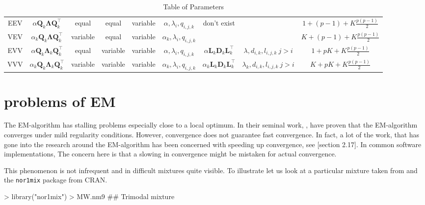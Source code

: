 \begin{table}[!htb]
{\begin{tabular}{| c | c c c c c | c c c |}
        EEV    & $ \alpha \pmb{Q}_k \pmb{\Lambda} \pmb{Q}_k^\top $ &equal & equal & variable & $ \alpha, \lambda_{i}, q_{i,j,k} $ &  don't exist  & & $ 1+(p-1)+K\frac{p(p-1)}{2} $ \\
        VEV    & $ \alpha_k \pmb{Q}_k \pmb{\Lambda} \pmb{Q}_k^\top $ &variable & equal & variable & $ \alpha_k, \lambda_{i}, q_{i,j,k} $ & & & $ K+(p-1)+K\frac{p(p-1)}{2} $ \\
        \hline
        EVV    & $ \alpha \pmb{Q}_k \pmb{\Lambda}_k \pmb{Q}_k^\top $ & equal & variable & variable & $ \alpha, \lambda_{i}, q_{i,j,k} $ & $ \alpha \pmb{L}_k \pmb{D}_k \pmb{L}_k^\top $ & $ \lambda, d_{i,k}, l_{i,j,k}\ j>i $ & $ 1+pK+K\frac{p(p-1)}{2} $  \\
        VVV    & $ \alpha_k \pmb{Q}_k \pmb{\Lambda}_k \pmb{Q}_k^\top $ & variable & variable & variable & $ \alpha_k, \lambda_{i}, q_{i,j,k} $ & $ \alpha_k \pmb{L}_k \pmb{D}_k \pmb{L}_k^\top $ & $ \lambda_k, d_{i,k}, l_{i,j,k}\ j>i $ & $ K+pK+K\frac{p(p-1)}{2} $ \\
        \hline
    \end{tabular}

}

\caption{Table of Parameters}
\label{table:param}
\end{table}

\clearpage


\section{problems of EM}


The EM-algorithm has stalling problems especially close to a local optimum.
In their seminal work, \cite{Dem77}, have proven that the EM-algorithm 
converges under mild regularity conditions. 
However, convergence does not guarantee fast convergence. In fact, a lot of 
the work, that has gone into the research around the EM-algorithm has been 
concerned with speeding up convergence, see \cite{McL00}[section 2.17].
In common software implementations, %
The concern here is that a slowing in convergence might be mistaken for actual
convergence.

This phenomenon is not infrequent and in difficult mixtures quite visible.
To illustrate let us look at a particular mixture taken from \cite{Mar92} and
the {\tt nor1mix} package from CRAN.

\begin{Schunk}
\begin{Sinput}
> library("nor1mix")
> MW.nm9 ## Trimodal mixture
\end{Sinput}
\end{Schunk}


